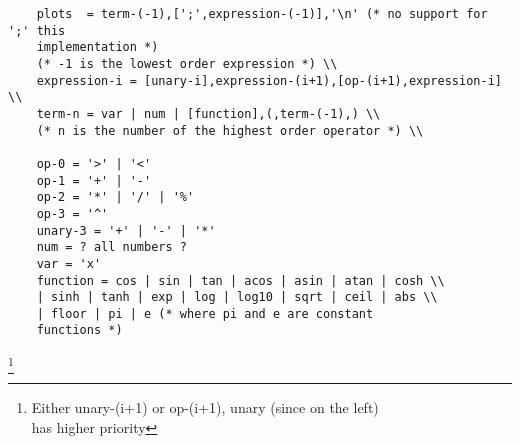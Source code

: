 \begin{verbatim}
    plots  = term-(-1),[';',expression-(-1)],'\n' (* no support for ';' this
    implementation *)
    (* -1 is the lowest order expression *) \\
    expression-i = [unary-i],expression-(i+1),[op-(i+1),expression-i]  \\
    term-n = var | num | [function],(,term-(-1),) \\
    (* n is the number of the highest order operator *) \\

    op-0 = '>' | '<'
    op-1 = '+' | '-'
    op-2 = '*' | '/' | '%'
    op-3 = '^'
    unary-3 = '+' | '-' | '*' 
    num = ? all numbers ?
    var = 'x'
    function = cos | sin | tan | acos | asin | atan | cosh \\
    | sinh | tanh | exp | log | log10 | sqrt | ceil | abs \\
    | floor | pi | e (* where pi and e are constant
    functions *)
\end{verbatim}
\footnote{Either unary-(i+1) or op-(i+1), unary (since on the left) \\
    has higher priority }

